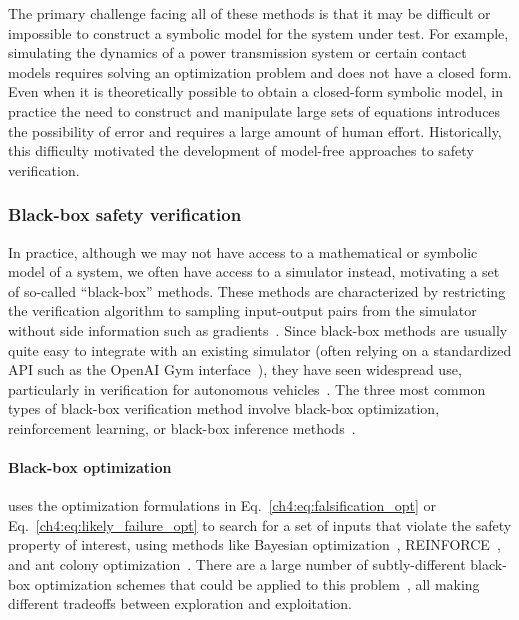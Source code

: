 The primary challenge facing all of these methods is that it may be difficult or impossible to construct a symbolic model for the system under test. For example, simulating the dynamics of a power transmission system or certain contact models requires solving an optimization problem and does not have a closed form. Even when it is theoretically possible to obtain a closed-form symbolic model, in practice the need to construct and manipulate large sets of equations introduces the possibility of error and requires a large amount of human effort. Historically, this difficulty motivated the development of model-free approaches to safety verification.

\subsubsection{Black-box safety verification}


In practice, although we may not have access to a mathematical or symbolic model of a system, we often have access to a simulator instead, motivating a set of so-called ``black-box'' methods. These methods are characterized by restricting the verification algorithm to sampling input-output pairs from the simulator without side information such as gradients~\cite{corsoSurveyAlgorithmsBlackBox2021a}. Since black-box methods are usually quite easy to integrate with an existing simulator (often relying on a standardized API such as the OpenAI Gym interface~\cite{brockmanOpenAIGym2016}), they have seen widespread use, particularly in verification for autonomous vehicles~\cite{xuSafeBenchBenchmarkingPlatform2022,riedmaierSurveyScenarioBasedSafety2020,okellyScalableEndtoEndAutonomous2018a,corsoAdaptiveStressTesting2019,wangAdvSimGeneratingSafetyCritical2021a,sunCornerCaseGeneration2021,zhongGuidedConditionalDiffusion2022,corsoInterpretableSafetyValidation2020,zhangAdversarialRobustnessTrajectory2022,hanselmannKINGGeneratingSafetyCritical2022}. The three most common types of black-box verification method involve black-box optimization, reinforcement learning, or black-box inference methods~\cite{corsoSurveyAlgorithmsBlackBox2021a}.

\paragraph{Black-box optimization} uses the optimization formulations in Eq.~\eqref{ch4:eq:falsification_opt} or Eq.~\eqref{ch4:eq:likely_failure_opt} to search for a set of inputs that violate the safety property of interest, using methods like Bayesian optimization~\cite{wangAdvSimGeneratingSafetyCritical2021a}, REINFORCE~\cite{dingLearningCollideAdaptive2020a}, and ant colony optimization~\cite{annpureddySTaLiRoToolTemporal2011}. There are a large number of subtly-different black-box optimization schemes that could be applied to this problem~\cite{kochenderfer_wheeler_2019}, all making different tradeoffs between exploration and exploitation.

